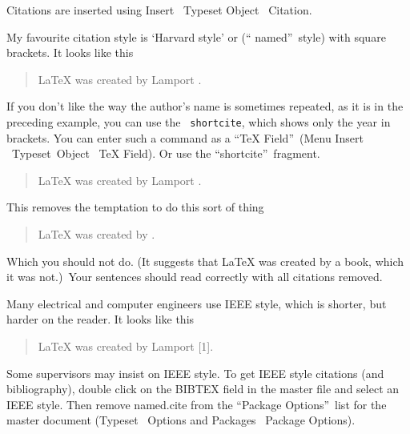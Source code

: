 Citations are inserted using Insert \TEXTsymbol{>}\TEXTsymbol{>}\ Typeset
Object \TEXTsymbol{>}\TEXTsymbol{>}\ Citation.

My favourite citation style is `Harvard style' or (\textquotedblleft
named\textquotedblright\ style) with square brackets. It looks like this

\begin{quotation}
LaTeX was created by Lamport \cite{Lamport-1994}.
\end{quotation}

If you don't like the way the author's name is sometimes repeated, as it is
in the preceding example, you can use the \texttt{\TEXTsymbol{\backslash}%
shortcite}, which shows only the year in brackets. You can enter such a
command as a \textquotedblleft TeX Field\textquotedblright\ (Menu Insert 
\TEXTsymbol{>}\TEXTsymbol{>}\ Typeset\ Object \TEXTsymbol{>}\TEXTsymbol{>}\
TeX Field). Or use the \textquotedblleft shortcite\textquotedblright\
fragment.

\begin{quotation}
LaTeX was created by Lamport 
\shortcite{Lamport-1994}%
.
\end{quotation}

\noindent This removes the temptation to do this sort of thing

\begin{quotation}
LaTeX was created by \cite{Lamport-1994}.
\end{quotation}

\noindent Which you should not do. (It suggests that LaTeX was created by a
book, which it was not.)\ Your sentences should read correctly with all
citations removed.

Many electrical and computer engineers use IEEE style, which is shorter, but
harder on the reader. It looks like this

\begin{quotation}
LaTeX was created by Lamport [1].
\end{quotation}

\noindent Some supervisors may insist on IEEE style. To get IEEE style
citations (and bibliography), double click on the BIBTEX field in the master
file and select an IEEE style. Then remove named.cite from the
\textquotedblleft Package Options\textquotedblright\ list for the master
document (Typeset \TEXTsymbol{>}\TEXTsymbol{>}\ Options and Packages 
\TEXTsymbol{>}\TEXTsymbol{>}\ Package Options).

